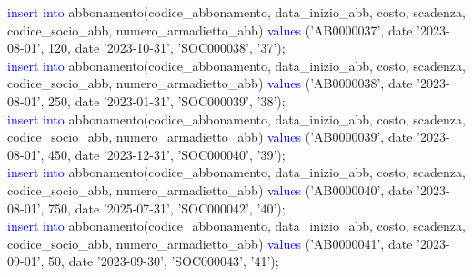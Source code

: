 \documentclass{article}
\begin{document}
\begin{flushleft}
{        \hspace*{0.5em}\textcolor{blue}{insert into} abbonamento(codice\_abbonamento, data\_inizio\_abb, costo, scadenza, \hspace*{0.5em}codice\_socio\_abb, numero\_armadietto\_abb) \textcolor{blue}{values} ('AB0000037', date '2023-08-01', \hspace*{0.5em}120, date '2023-10-31', 'SOC000038', '37'); \\
        \vspace{2mm}
        \hspace*{0.5em}\textcolor{blue}{insert into} abbonamento(codice\_abbonamento, data\_inizio\_abb, costo, scadenza, \hspace*{0.5em}codice\_socio\_abb, numero\_armadietto\_abb) \textcolor{blue}{values} ('AB0000038', date '2023-08-01', \hspace*{0.5em}250, date '2023-01-31', 'SOC000039', '38'); \\
        \vspace{2mm}
        \hspace*{0.5em}\textcolor{blue}{insert into} abbonamento(codice\_abbonamento, data\_inizio\_abb, costo, scadenza, \hspace*{0.5em}codice\_socio\_abb, numero\_armadietto\_abb) \textcolor{blue}{values} ('AB0000039', date '2023-08-01', \hspace*{0.5em}450, date '2023-12-31', 'SOC000040', '39'); \\
        \vspace{2mm}
        \hspace*{0.5em}\textcolor{blue}{insert into} abbonamento(codice\_abbonamento, data\_inizio\_abb, costo, scadenza, \hspace*{0.5em}codice\_socio\_abb, numero\_armadietto\_abb) \textcolor{blue}{values} ('AB0000040', date '2023-08-01', \hspace*{0.5em}750, date '2025-07-31', 'SOC000042', '40'); \\
        \vspace{2mm}
        \hspace*{0.5em}\textcolor{blue}{insert into} abbonamento(codice\_abbonamento, data\_inizio\_abb, costo, scadenza, \hspace*{0.5em}codice\_socio\_abb, numero\_armadietto\_abb) \textcolor{blue}{values} ('AB0000041', date '2023-09-01', \hspace*{0.5em}50, date '2023-09-30', 'SOC000043', '41'); \\
        \vspace{2mm}
}
\end{flushleft}
\end{document}
